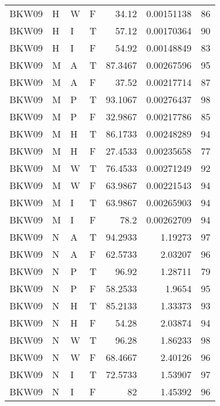 \begin{table}[htb!]
{\begin{tabular}{llllrrr}
            BKW09    & H     & W     & F          & 34.12      & 0.00151138  & 86       \\
            BKW09    & H     & I     & T          & 57.12      & 0.00170364  & 90       \\
            BKW09    & H     & I     & F          & 54.92      & 0.00148849  & 83       \\
            BKW09    & M     & A     & T          & 87.3467    & 0.00267596  & 95       \\
            BKW09    & M     & A     & F          & 37.52      & 0.00217714  & 87       \\
            BKW09    & M     & P     & T          & 93.1067    & 0.00276437  & 98       \\
            BKW09    & M     & P     & F          & 32.9867    & 0.00217786  & 85       \\
            BKW09    & M     & H     & T          & 86.1733    & 0.00248289  & 94       \\
            BKW09    & M     & H     & F          & 27.4533    & 0.00235658  & 77       \\
            BKW09    & M     & W     & T          & 76.4533    & 0.00271249  & 92       \\
            BKW09    & M     & W     & F          & 63.9867    & 0.00221543  & 94       \\
            BKW09    & M     & I     & T          & 63.9867    & 0.00265903  & 94       \\
            BKW09    & M     & I     & F          & 78.2       & 0.00262709  & 94       \\
            BKW09    & N     & A     & T          & 94.2933    & 1.19273     & 97       \\
            BKW09    & N     & A     & F          & 62.5733    & 2.03207     & 96       \\
            BKW09    & N     & P     & T          & 96.92      & 1.28711     & 79       \\
            BKW09    & N     & P     & F          & 58.2533    & 1.9654      & 95       \\
            BKW09    & N     & H     & T          & 85.2133    & 1.33373     & 93       \\
            BKW09    & N     & H     & F          & 54.28      & 2.03874     & 94       \\
            BKW09    & N     & W     & T          & 96.28      & 1.86233     & 98       \\
            BKW09    & N     & W     & F          & 68.4667    & 2.40126     & 96       \\
            BKW09    & N     & I     & T          & 72.5733    & 1.53907     & 97       \\
            BKW09    & N     & I     & F          & 82         & 1.45392     & 96       \\
            \hline
        \end{tabular}
    }{
    }
\end{table} 
